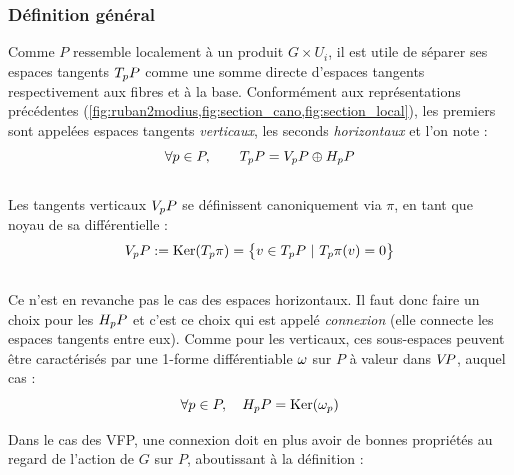 \subsubsection{Définition général}\label{subsec:def2conn}

Comme $P$ ressemble localement à un produit $G\times U_i$, il est utile de séparer ses espaces tangents $\tg[p]{P}$ comme une somme directe d'espaces tangents respectivement aux fibres et à la base. Conformément aux représentations précédentes (\cref{fig:ruban2modius,fig:section_cano,fig:section_local}), les premiers sont appelées espaces tangents \emph{verticaux}, les seconds \emph{horizontaux} et l'on note :
\[\forall p\in P,\qquad \tg[p]{P} = \vg[p]{P} \oplus \hg[p]{P}\]
\\
Les tangents verticaux $\vg[p]{P}$ se définissent canoniquement via $\pi$, en tant que noyau de sa différentielle :
\[\vg[p]{P} \defeq \Ker (\tg[p]{\pi}) = \big\{ v\in\tg[p]{P}\ |\ \tg[p]{\pi}(v)=0 \big\}\]
\\ 
Ce n'est en revanche pas le cas des espaces horizontaux. Il faut donc faire un choix pour les $\hg[p]{P}$ et c'est ce choix qui est appelé \emph{connexion} (elle connecte les espaces tangents entre eux).
Comme pour les verticaux, ces sous-espaces peuvent être caractérisés par une 1-forme différentiable $\conn$ sur $P$ à valeur dans $\vg{P}$, auquel cas :
\[\forall p\in P,\quad \hg[p]{P} = \Ker(\conn_p)\]
\skipl

Dans le cas des VFP, une connexion doit en plus avoir de bonnes propriétés au regard de l'action de $G$ sur $P$, aboutissant à la définition :

